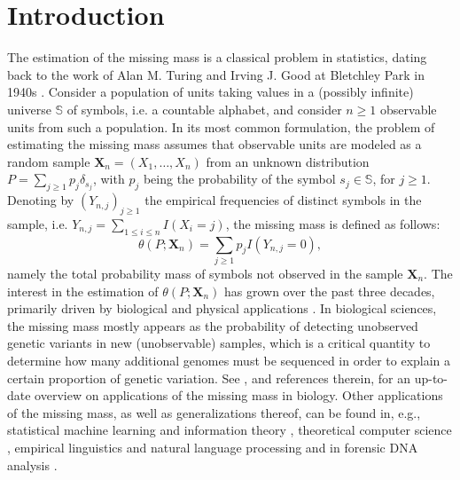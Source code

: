 \documentclass{article}
\newcommand{\1}{\boldsymbol{1}}
\theoremstyle{plain}
\begin{document}
\section{Introduction}

The estimation of the missing mass is a classical problem in statistics, dating back to the work of Alan M. Turing and Irving J. Good at Bletchley Park in 1940s \cite{Goo(53)}. Consider a population of units taking values in a (possibly infinite) universe $\mathbb{S}$ of symbols, i.e. a countable alphabet, and consider $n\geq1$ observable units from such a population. In its most common formulation, the problem of estimating the missing mass assumes that observable units are modeled as a random sample $\mathbf{X}_{n}=(X_{1},\ldots,X_{n})$ from an unknown distribution $P=\sum_{j\geq1}p_{j}\delta_{s_{j}}$, with $p_{j}$ being the probability of the symbol $s_{j}\in\mathbb{S}$, for $j\geq1$. Denoting by $(Y_{n,j})_{j\geq1}$ the empirical frequencies of distinct symbols in the sample, i.e. $Y_{n,j}=\sum_{1\leq i\leq n}I(X_{i}=j)$, the missing mass is defined as follows:
\begin{equation}\label{eq:missing}
\theta(P;\mathbf{X}_{n})=\sum_{j\geq1}p_{j}I(Y_{n,j}=0),
\end{equation}
namely the total probability mass of symbols not observed in the sample $\mathbf{X}_{n}$. The interest in the estimation of $\theta(P;\mathbf{X}_{n})$ has grown over the past three decades, primarily driven by biological and physical applications \cite{Mao(02),Gao(07),Ion(09),Dal(13),Dal(14)}. In biological sciences, the missing mass mostly appears as the probability of detecting unobserved genetic variants in new (unobservable) samples, which is a critical quantity to determine how many additional genomes must be sequenced in order to explain a certain proportion of genetic variation. See \cite{Den(19)}, and references therein, for an up-to-date overview on applications of the missing mass in biology. Other applications of the missing mass, as well as generalizations thereof, can be found in, e.g., statistical machine learning and information theory \cite{Bub(13),Orl(04),Ben(18)}, theoretical computer science \cite{Mot(06),Cai(18)}, empirical linguistics and natural language processing \cite{Gal(95)} and in forensic DNA analysis \cite{Cer(17)}.
\end{document}
